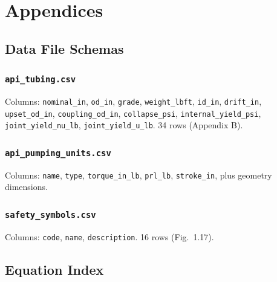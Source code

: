 \documentclass[11pt,a4paper,openany]{book}
\newcommand{\code}[1]{\texttt{#1}}
\begin{document}
\appendix

\part{Appendices}

\chapter{Data File Schemas}

\section{\code{api\_tubing.csv}}
Columns: \code{nominal\_in}, \code{od\_in}, \code{grade},
\code{weight\_lbft}, \code{id\_in}, \code{drift\_in},
\code{upset\_od\_in}, \code{coupling\_od\_in}, \code{collapse\_psi},
\code{internal\_yield\_psi}, \code{joint\_yield\_nu\_lb},
\code{joint\_yield\_u\_lb}. 34 rows (Appendix B).

\section{\code{api\_pumping\_units.csv}}
Columns: \code{name}, \code{type}, \code{torque\_in\_lb},
\code{prl\_lb}, \code{stroke\_in}, plus geometry dimensions.

\section{\code{safety\_symbols.csv}}
Columns: \code{code}, \code{name}, \code{description}. 16 rows
(Fig.~1.17).

\chapter{Equation Index}
\end{document}
